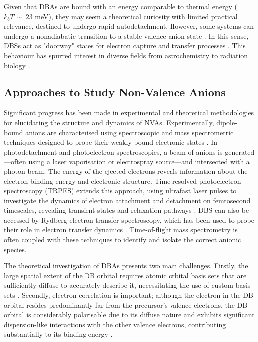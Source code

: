 Given that DBAs are bound with an energy comparable to thermal energy ($k_bT\,\sim\,23$ meV), they may seem a theoretical curiosity with limited practical relevance, destined to undergo rapid autodetachment. However, some systems can undergo a nonadiabatic transition to a stable valence anion state \cite{herbert2015quantum,jordan2003theory}. In this sense, DBSs act as "doorway" states for electron capture and transfer processes \cite{sommerfeld2002coupling,jordan2003theory,kang2024reaction}. This behaviour has spurred interest in diverse fields from astrochemistry \cite{fortenberry2015interstellar} to radiation biology \cite{narayanan2023secondary,sedmidubska2024interaction}.

\subsection{Approaches to Study Non-Valence Anions}
Significant progress has been made in experimental and theoretical methodologies for elucidating the structure and dynamics of NVAs. Experimentally, dipole-bound anions are characterised using spectroscopic and mass spectrometric techniques designed to probe their weakly bound electronic states \cite{simons2008molecular}. In photodetachment and photoelectron spectroscopies, a beam of anions is generated—often using a laser vaporisation or electrospray source—and intersected with a photon beam. The energy of the ejected electrons reveals information about the electron binding energy and electronic structure. Time-resolved photoelectron spectroscopy (TRPES) extends this approach, using ultrafast laser pulses to investigate the dynamics of electron attachment and detachment on femtosecond timescales, revealing transient states and relaxation pathways \cite{clarke2024dynamics}. DBS can also be accessed by Rydberg electron transfer spectroscopy, which has been used to probe their role in electron transfer dynamics \cite{bradforth2002excited}. Time-of-flight mass spectrometry is often coupled with these techniques to identify and isolate the correct anionic species.

The theoretical investigation of DBAs presents two main challenges. Firstly, the large spatial extent of the DB orbital requires atomic orbital basis sets that are sufficiently diffuse to accurately describe it, necessitating the use of custom basis sets \cite{skurski2000choose}. Secondly, electron correlation is important; although the electron in the DB orbital resides predominantly far from the precursor's valence electrons, the DB orbital is considerably polarisable due to its diffuse nature and exhibits significant dispersion-like interactions with the other valence electrons, contributing substantially to its binding energy \cite{simons2008molecular,simons2023molecular,gutowski1996contribution}.

